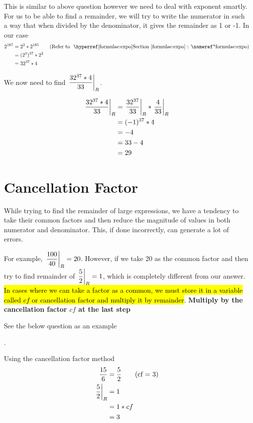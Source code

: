 
This is similar to above question however we need to deal with exponent smartly. For us to be able to find a remainder, we will try to write the numerator in such a way that when divided by the denominator, it gives the remainder as 1 or -1. In our case
\begin{align*}
    2^{187} &= 2^2 * 2^{185} \tag{Refer to \fullref{formulae:expo}} \\
    &= (2^{5})^{37} * 2^2 \\
    &= 32^{37} * 4
\end{align*}

We now need to find $\displaystyle{ \left. \frac{32^{37} * 4}{33} \right |_{R} }$.

\begin{align*}
    \displaystyle{ \left. \frac{32^{37} * 4}{33} \right |_{R} } &= \displaystyle{ \left. \frac{32^{37}}{33} \right |_{R} } * \displaystyle{ \left. \frac{4}{33} \right |_{R} } \\
    &= (-1)^{37} * 4\\
    &= -4 \\
    &= 33 - 4 \\
    &= 29
\end{align*}

\section{Cancellation Factor} \label{sec:rem-cancel-factor}

While trying to find the remainder of large expressions, we have a tendency to take their common factors and then reduce the magnitude of values in both numerator and denominator. This, if done incorrectly, can generate a lot of errors. 

For example, $\displaystyle{ \left. \frac{100}{40} \right |_{R} } = 20$. However, if we take 20 as the common factor and then try to find remainder of $\displaystyle{ \left. \frac{5}{2} \right |_{R} } = 1$, which is completely different from our answer. \hl{In cases where we can take a factor as a common, we must store it in a variable called $cf$ or cancellation factor and multiply it by remainder}. \textbf{Multiply by the cancellation factor $cf$ at the last step}

See the below question as an example

.

Using the cancellation factor method
\begin{align*}
    \dfrac{15}{6} &= \dfrac{5}{2} \tag{cf = 3} \\
    \displaystyle{ \left. \frac{5}{2} \right |_{R} } &= 1 \\
    &= 1 * cf \\
    &= 3
\end{align*}

